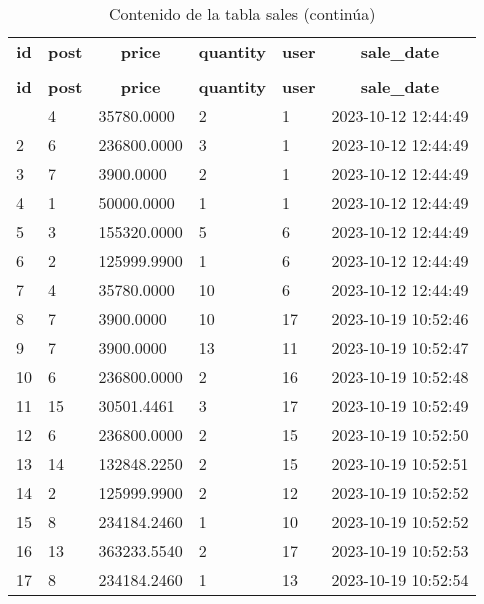 %
%
 \begin{longtable}{|l|l|l|l|l|l|} 
 \hline \endhead \hline \endfoot \hline 
 \caption{Contenido de la tabla sales} \label{tab:sales-data} \\\hline \multicolumn{1}{|c|}{\textbf{id}} & \multicolumn{1}{|c|}{\textbf{post}} & \multicolumn{1}{|c|}{\textbf{price}} & \multicolumn{1}{|c|}{\textbf{quantity}} & \multicolumn{1}{|c|}{\textbf{user}} & \multicolumn{1}{|c|}{\textbf{sale\_date}} \\ \hline \hline  \endfirsthead 
\caption{Contenido de la tabla sales (continúa)} \\ \hline \multicolumn{1}{|c|}{\textbf{id}} & \multicolumn{1}{|c|}{\textbf{post}} & \multicolumn{1}{|c|}{\textbf{price}} & \multicolumn{1}{|c|}{\textbf{quantity}} & \multicolumn{1}{|c|}{\textbf{user}} & \multicolumn{1}{|c|}{\textbf{sale\_date}} \\ \hline \hline \endhead \endfoot
1 & 4 & 35780.0000 & 2 & 1 & 2023-10-12 12:44:49 \\ \hline 
2 & 6 & 236800.0000 & 3 & 1 & 2023-10-12 12:44:49 \\ \hline 
3 & 7 & 3900.0000 & 2 & 1 & 2023-10-12 12:44:49 \\ \hline 
4 & 1 & 50000.0000 & 1 & 1 & 2023-10-12 12:44:49 \\ \hline 
5 & 3 & 155320.0000 & 5 & 6 & 2023-10-12 12:44:49 \\ \hline 
6 & 2 & 125999.9900 & 1 & 6 & 2023-10-12 12:44:49 \\ \hline 
7 & 4 & 35780.0000 & 10 & 6 & 2023-10-12 12:44:49 \\ \hline 
8 & 7 & 3900.0000 & 10 & 17 & 2023-10-19 10:52:46 \\ \hline 
9 & 7 & 3900.0000 & 13 & 11 & 2023-10-19 10:52:47 \\ \hline 
10 & 6 & 236800.0000 & 2 & 16 & 2023-10-19 10:52:48 \\ \hline 
11 & 15 & 30501.4461 & 3 & 17 & 2023-10-19 10:52:49 \\ \hline 
12 & 6 & 236800.0000 & 2 & 15 & 2023-10-19 10:52:50 \\ \hline 
13 & 14 & 132848.2250 & 2 & 15 & 2023-10-19 10:52:51 \\ \hline 
14 & 2 & 125999.9900 & 2 & 12 & 2023-10-19 10:52:52 \\ \hline 
15 & 8 & 234184.2460 & 1 & 10 & 2023-10-19 10:52:52 \\ \hline 
16 & 13 & 363233.5540 & 2 & 17 & 2023-10-19 10:52:53 \\ \hline 
17 & 8 & 234184.2460 & 1 & 13 & 2023-10-19 10:52:54 \\ \hline 

\end{longtable}
